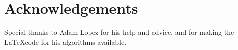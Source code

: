 \documentclass{pbml}
\begin{document}
% 
% 
% 
% 
% 
% 
% 
% 
% 
% 
% 
% 
% 

\section*{Acknowledgements}

Special thanks to Adam Lopez for his help and advice, and for making the \LaTeX code for his algorithms available. 




% 
\end{document}
